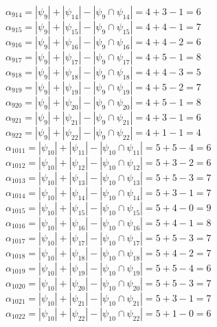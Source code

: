 \documentclass[a4paper,12pt]{article}
\begin{document}
$\alpha_{914} = |\psi_{9}| + |\psi_{14}| - |\psi_{9} \cap \psi_{14}| = 4 + 3 - 1 = 6$\\
$\alpha_{915} = |\psi_{9}| + |\psi_{15}| - |\psi_{9} \cap \psi_{15}| = 4 + 4 - 1 = 7$\\
$\alpha_{916} = |\psi_{9}| + |\psi_{16}| - |\psi_{9} \cap \psi_{16}| = 4 + 4 - 2 = 6$\\
$\alpha_{917} = |\psi_{9}| + |\psi_{17}| - |\psi_{9} \cap \psi_{17}| = 4 + 5 - 1 = 8$\\
$\alpha_{918} = |\psi_{9}| + |\psi_{18}| - |\psi_{9} \cap \psi_{18}| = 4 + 4 - 3 = 5$\\
$\alpha_{919} = |\psi_{9}| + |\psi_{19}| - |\psi_{9} \cap \psi_{19}| = 4 + 5 - 2 = 7$\\
$\alpha_{920} = |\psi_{9}| + |\psi_{20}| - |\psi_{9} \cap \psi_{20}| = 4 + 5 - 1 = 8$\\
$\alpha_{921} = |\psi_{9}| + |\psi_{21}| - |\psi_{9} \cap \psi_{21}| = 4 + 3 - 1 = 6$\\
$\alpha_{922} = |\psi_{9}| + |\psi_{22}| - |\psi_{9} \cap \psi_{22}| = 4 + 1 - 1 = 4$\\
$\alpha_{1011} = |\psi_{10}| + |\psi_{11}| - |\psi_{10} \cap \psi_{11}| = 5 + 5 - 4 = 6$\\
$\alpha_{1012} = |\psi_{10}| + |\psi_{12}| - |\psi_{10} \cap \psi_{12}| = 5 + 3 - 2 = 6$\\
$\alpha_{1013} = |\psi_{10}| + |\psi_{13}| - |\psi_{10} \cap \psi_{13}| = 5 + 5 - 3 = 7$\\
$\alpha_{1014} = |\psi_{10}| + |\psi_{14}| - |\psi_{10} \cap \psi_{14}| = 5 + 3 - 1 = 7$\\
$\alpha_{1015} = |\psi_{10}| + |\psi_{15}| - |\psi_{10} \cap \psi_{15}| = 5 + 4 - 0 = 9$\\
$\alpha_{1016} = |\psi_{10}| + |\psi_{16}| - |\psi_{10} \cap \psi_{16}| = 5 + 4 - 1 = 8$\\
$\alpha_{1017} = |\psi_{10}| + |\psi_{17}| - |\psi_{10} \cap \psi_{17}| = 5 + 5 - 3 = 7$\\
$\alpha_{1018} = |\psi_{10}| + |\psi_{18}| - |\psi_{10} \cap \psi_{18}| = 5 + 4 - 2 = 7$\\
$\alpha_{1019} = |\psi_{10}| + |\psi_{19}| - |\psi_{10} \cap \psi_{19}| = 5 + 5 - 4 = 6$\\
$\alpha_{1020} = |\psi_{10}| + |\psi_{20}| - |\psi_{10} \cap \psi_{20}| = 5 + 5 - 3 = 7$\\
$\alpha_{1021} = |\psi_{10}| + |\psi_{21}| - |\psi_{10} \cap \psi_{21}| = 5 + 3 - 1 = 7$\\
$\alpha_{1022} = |\psi_{10}| + |\psi_{22}| - |\psi_{10} \cap \psi_{22}| = 5 + 1 - 0 = 6$\\
\end{document}
